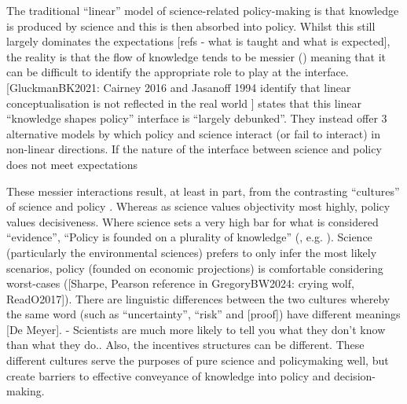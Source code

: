 The traditional ``linear'' model of science-related policy-making is that knowledge is produced by science and this is then absorbed into policy. Whilst this still largely dominates the expectations [refs - what is taught and what is expected], the reality is that the flow of knowledge tends to be messier (\cite{BoswellS2017}) meaning that it can be difficult to identify the appropriate role to play at the interface. [GluckmanBK2021: Cairney 2016 and Jasanoff 1994 identify that linear conceptualisation is not reflected in the real world ] \textcite{BoswellS2017} states that this linear ``knowledge shapes policy'' interface is ``largely debunked''. They instead offer 3 alternative models by which policy and science interact (or fail to interact) in non-linear directions. If the nature of the interface between science and policy does not meet expectations 

These messier interactions result, at least in part, from the contrasting ``cultures'' of science and policy \cite{Obermeister2022}. Whereas as science values objectivity most highly, policy values decisiveness. Where science sets a very high bar for what is considered ``evidence'', ``Policy is founded on a plurality of knowledge'' (\cite{GluckmanBK2021}, e.g. \cite{PiddingtonMD2024}). Science (particularly the environmental sciences) prefers to only infer the most likely scenarios, policy (founded on economic projections) is comfortable considering worst-cases ([Sharpe, Pearson reference in GregoryBW2024: crying wolf, ReadO2017]). There are linguistic differences between the two cultures whereby the same word (such as ``uncertainty'', ``risk'' \cite{Makin2024} and [proof]) have different meanings [De Meyer]. \cite{MountfordD2023} - Scientists are much more likely to tell you what they don't know than what they do.. Also, the incentives structures can be different. These different cultures serve the purposes of pure science and policymaking well, but create barriers to effective conveyance of knowledge into policy and decision-making.

